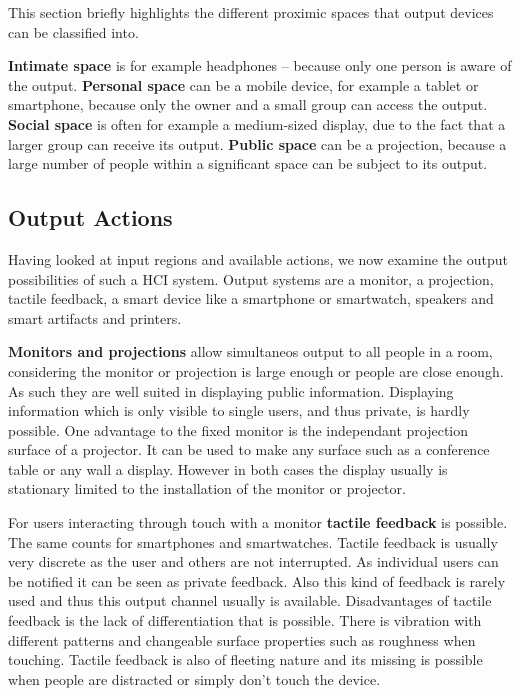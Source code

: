 This section briefly highlights the different proximic spaces that output devices can be classified into.

\textbf{Intimate space} is for example headphones – because only one person is aware of the output.
\textbf{Personal space} can be a mobile device, for example a tablet or smartphone, because only the owner and a small group can access the output.
\textbf{Social space} is often for example a medium-sized display, due to the fact that a larger group can receive its output.
\textbf{Public space} can be a projection, because a large number of people within a significant space can be subject to its output.

\subsection{Output Actions}

Having looked at input regions and available actions, we now examine the output possibilities of such a HCI system.
Output systems are a monitor, a projection, tactile feedback, a smart device like a smartphone or smartwatch, speakers and smart artifacts and printers.

\textbf{Monitors and projections} allow simultaneos output to all people in a room, considering the monitor or projection is large enough or people are close enough.
As such they are well suited in displaying public information.
Displaying information which is only visible to single users, and thus private, is hardly possible.
One advantage to the fixed monitor is the independant projection surface of a projector.
It can be used to make any surface such as a conference table or any wall a display.
However in both cases the display usually is stationary limited to the installation of the monitor or projector.

For users interacting through touch with a monitor \textbf{tactile feedback} is possible.
The same counts for smartphones and smartwatches.
Tactile feedback is usually very discrete as the user and others are not interrupted.
As individual users can be notified it can be seen as private feedback.
Also this kind of feedback is rarely used and thus this output channel usually is available.
Disadvantages of tactile feedback is the lack of differentiation that is possible.
There is vibration with different patterns and changeable surface properties such as roughness when touching.
Tactile feedback is also of fleeting nature and its missing is possible when people are distracted or simply don’t touch the device.

